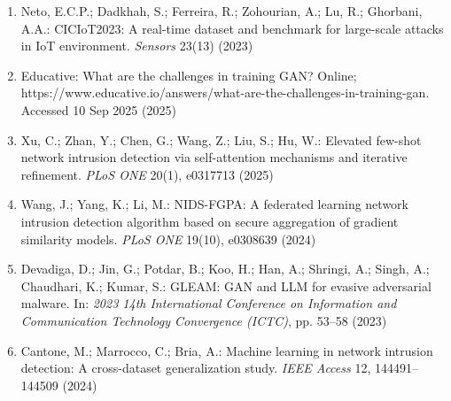\documentclass[a4paper]{article}
\begin{document}
\begin{enumerate}[leftmargin=1.2cm, itemsep=1pt, parsep=0pt]
    \item Neto, E.C.P.; Dadkhah, S.; Ferreira, R.; Zohourian, A.; Lu, R.; Ghorbani, A.A.: CICIoT2023: A real-time dataset and benchmark for large-scale attacks in IoT environment. \textit{Sensors} 23(13) (2023)
    \item Educative: What are the challenges in training GAN? Online; https://www.educative.io/answers/what-are-the-challenges-in-training-gan. Accessed 10 Sep 2025 (2025)
    \item Xu, C.; Zhan, Y.; Chen, G.; Wang, Z.; Liu, S.; Hu, W.: Elevated few-shot network intrusion detection via self-attention mechanisms and iterative refinement. \textit{PLoS ONE} 20(1), e0317713 (2025)
    \item Wang, J.; Yang, K.; Li, M.: NIDS-FGPA: A federated learning network intrusion detection algorithm based on secure aggregation of gradient similarity models. \textit{PLoS ONE} 19(10), e0308639 (2024)
    \item Devadiga, D.; Jin, G.; Potdar, B.; Koo, H.; Han, A.; Shringi, A.; Singh, A.; Chaudhari, K.; Kumar, S.: GLEAM: GAN and LLM for evasive adversarial malware. In: \textit{2023 14th International Conference on Information and Communication Technology Convergence (ICTC)}, pp. 53--58 (2023)
    \item Cantone, M.; Marrocco, C.; Bria, A.: Machine learning in network intrusion detection: A cross-dataset generalization study. \textit{IEEE Access} 12, 144491--144509 (2024)
\end{enumerate}
\end{document}
